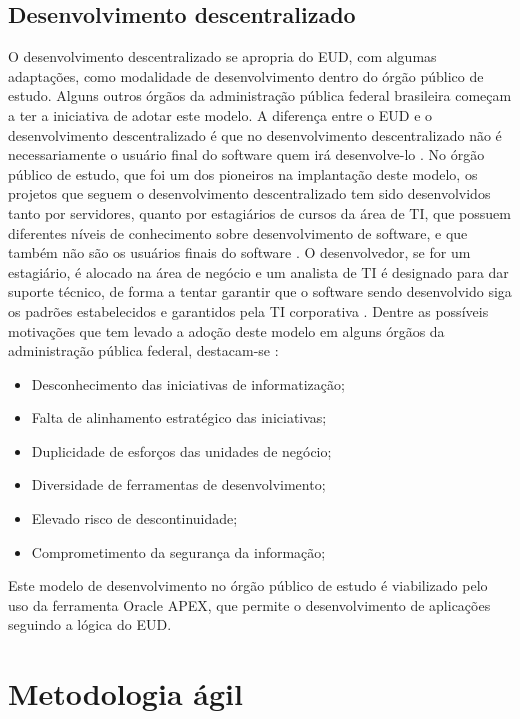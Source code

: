 \clearpage

\section{Desenvolvimento descentralizado}

O desenvolvimento descentralizado se apropria do EUD, com algumas adaptações, como modalidade de desenvolvimento dentro do órgão público de estudo. Alguns outros órgãos da administração pública federal brasileira começam a ter a iniciativa de adotar este modelo. A diferença entre o EUD e o desenvolvimento descentralizado é que no desenvolvimento descentralizado não é necessariamente o usuário final do software quem irá desenvolve-lo \cite{artigoTcuGovTI}. No órgão público de estudo, que foi um dos pioneiros na implantação deste modelo, os projetos que seguem o desenvolvimento descentralizado tem sido desenvolvidos tanto por servidores, quanto por estagiários de cursos da área de TI, que possuem diferentes níveis de conhecimento sobre desenvolvimento de software, e que também não são os usuários finais do software \cite{artigoTcuGovTI}. O desenvolvedor, se for um estagiário, é alocado na área de negócio e um analista de TI é designado para dar suporte técnico, de forma a tentar garantir que o software sendo desenvolvido siga os padrões estabelecidos e garantidos pela TI corporativa \cite{artigoTcuGovTI}.
Dentre as possíveis motivações que tem levado a adoção deste modelo em alguns órgãos da administração pública federal, destacam-se \cite{slideTCU}:

\begin{itemize}
\item Desconhecimento das iniciativas de informatização;
\item Falta de alinhamento estratégico das iniciativas;
\item Duplicidade de esforços das unidades de negócio;
\item Diversidade de ferramentas de desenvolvimento;
\item Elevado risco de descontinuidade;
\item Comprometimento da segurança da informação;
\end{itemize}

Este modelo de desenvolvimento no órgão público de estudo é viabilizado pelo uso da ferramenta Oracle APEX, que permite o desenvolvimento de aplicações seguindo a lógica do EUD.
\clearpage

\chapter[Metodologia ágil]{Metodologia ágil}

